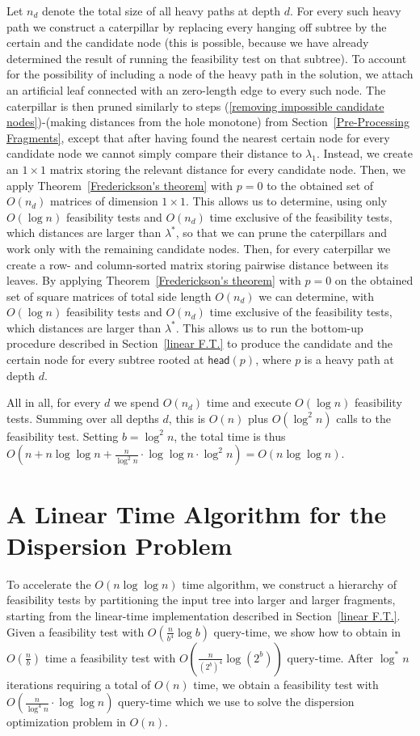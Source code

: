 \documentclass[a4paper,UKenglish]{lipics-v2016}
\theoremstyle{plain}
\newcommand{\head}{\textsf{head}}
\begin{document}
Let $n_{d}$ denote the total size of all heavy paths at depth $d$. For every such heavy path we construct a caterpillar by replacing
every hanging off subtree by the certain and the candidate node (this is possible, because we have already determined the result of
running the feasibility test on that subtree). To account for the possibility of including a node of the heavy path in the solution,
we attach an artificial leaf connected with an zero-length edge to every such node.
The caterpillar is then pruned similarly to steps (\ref{removing impossible candidate nodes})-(making distances from the hole monotone)
from Section~\ref{Pre-Processing Fragments}, except that after having found the nearest certain node for every candidate
node we cannot simply compare their distance to $\lambda_{1}$. Instead, we create an $1\times 1$ matrix storing the relevant
distance for every candidate node. Then, we apply Theorem~\ref{Frederickson's theorem} with $p=0$ to the obtained set of
$O(n_{d})$ matrices of dimension $1\times 1$. This allows us to determine, using only $O(\log n)$ feasibility tests and
$O(n_{d})$ time exclusive of the feasibility tests, which distances are larger than $\lambda^{*}$, so that we can prune
the caterpillars and work only with the remaining candidate nodes. Then, for every caterpillar we create a row- and column-sorted matrix
storing pairwise distance between its leaves. By applying Theorem~\ref{Frederickson's theorem} with $p=0$ on the obtained set of
square matrices of total side length $O(n_{d})$ we can determine, with $O(\log n)$ feasibility tests and $O(n_{d})$ time
exclusive of the feasibility tests, which distances are larger than $\lambda^{*}$. This allows us to run the bottom-up
procedure described in Section~\ref{linear F.T.} to produce the candidate and the certain node for every subtree rooted
at $\head(p)$, where $p$ is a heavy path at depth $d$.

All in all, for every $d$ we spend $O(n_{d})$ time and execute $O(\log n)$ feasibility tests. Summing over all depths $d$,
this is $O(n)$ plus $O(\log^{2}n)$ calls to the feasibility test. Setting $b=\log^{2}n$, the total time is thus $O(n+n\log\log n+\frac{n}{\log^{2}n}\cdot\log\log n\cdot \log^{2}n)=O(n\log\log n)$.

\section{A Linear Time Algorithm for the Dispersion Problem}
\label{sectionLinear}

To accelerate the $O(n\log\log n)$ time algorithm, we construct a hierarchy of feasibility tests by partitioning the input tree
into larger and larger fragments, starting from the linear-time implementation described in Section~\ref{linear F.T.}. 
Given a feasibility test with $O(\frac{n}{b^4}\log b)$ query-time, we show how to obtain in $O(\frac{n}{b})$ time a feasibility test with
$O(\frac{n}{(2^b)^{4}}\log (2^b))$ query-time.
After $\log ^*n$ iterations requiring a total of $O(n)$ time, we obtain a feasibility test with $O(\frac{n}{\log ^4n} \cdot \log \log n)$ query-time
which we use to solve the dispersion optimization problem in $O(n)$. 
\end{document}
